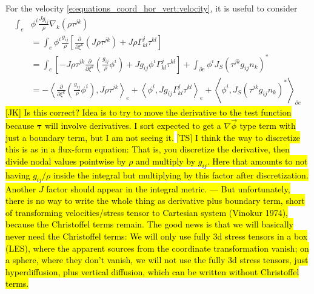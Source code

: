 \documentclass{report}
\newcommand{\inner}[2]{ \left\langle #1, #2 \right\rangle }
\begin{document}
For the velocity \eqref{e:equations_coord_hor_vert:velocity}, it is useful to consider
\begin{align}
  \int_{e} &\phi^{i}\frac{Jg_{ij}}{\rho} \nabla_{k}\left(\rho \tau^{jk}\right)\nonumber\\
  &=
  \int_{e} \phi^{i}\frac{g_{ij}}{\rho}\left[
  \frac{\partial}{\partial \xi^{k}}\left(J\rho\tau^{jk}\right)
  +
  J \rho \Gamma_{kl}^{j} \tau^{kl}
  \right]\nonumber\\
  &=
  \int_{e} \left[-
  J\rho\tau^{jk}
  \frac{\partial}{\partial \xi^{k}}\left(
  \frac{g_{ij}}{\rho}
  \phi^{i}
  \right)
  +
  Jg_{ij}\phi^{i} \Gamma_{kl}^{j} \tau^{kl}
  \right]
  +
  \int_{\partial e }
  \phi^{i} J_{S} {\left(\tau^{jk} g_{ij}n_{k}\right)}^{*}
  \nonumber\\
  &=
  -\inner{
  \frac{\partial}{\partial \xi^{k}}\left(
  \frac{g_{ij}}{\rho}
  \phi^{i}
  \right)
  }{
  J\rho\tau^{jk}
  }_{e}
  +
  \inner{\phi^{i}}{Jg_{ij} \Gamma_{kl}^{j} \tau^{kl}}_{e}
  +
  \inner{\phi^{i}}{J_{S} {\left(\tau^{jk} g_{ij}n_{k}\right)}^{*}}_{\partial e}
\end{align}
\hl{[JK] Is this correct? Idea is to try to move the derivative to the test function because ${\boldsymbol \tau}$ will involve derivatives.
I sort expected to get a $\nabla \vec{\phi}$ type term with just a boundary term, but I am not seeing it.} \hl{[TS] I think the way to discretize this is as in a flux-form equation: That is, you discretize the derivative, then divide nodal values pointwise by $\rho$ and multiply by $g_{ij}$. Here that amounts to not having $g_{ij}/\rho$ inside the integral but multiplying by this factor after discretization. Another $J$ factor should appear in the integral metric. --- But unfortunately, there is no way to write the whole thing as derivative plus boundary term, short of transforming velocities/stress tensor to Cartesian system (Vinokur 1974), because the Christoffel terms remain. The good news is that we will basically never need the Christoffel terms: We will only use fully 3d stress tensors in a box (LES), where the apparent sources from the coordinate transformation vanish; on a sphere, where they don't vanish, we will not use the fully 3d stress tensors, just hyperdiffusion, plus vertical diffusion, which can be written without Christoffel terms.}
\end{document}

